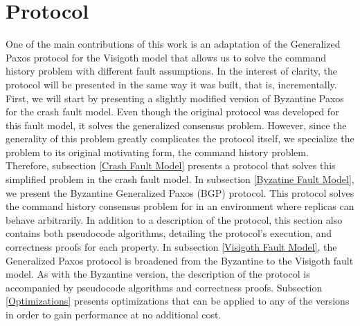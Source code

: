 \chapter{Protocol}

One of the  main contributions of this work is an adaptation of the Generalized Paxos protocol for the Visigoth model that allows us to solve the command history problem with different fault assumptions. In the interest of clarity, the protocol will be presented in the same way it was built, that is, incrementally. First, we will start by presenting a slightly modified version of Byzantine Paxos for the crash fault model. Even though the original protocol was developed for this fault model, it solves the generalized consensus problem. However, since the generality of this problem greatly complicates the protocol itself, we specialize the problem to its original motivating form, the command history problem. Therefore, subsection \ref{Crash Fault Model} presents a protocol that solves this simplified problem in the crash fault model. In subsection \ref{Byzatine Fault Model}, we present the Byzantine Generalized Paxos (BGP) protocol. This protocol solves the command history consensus problem for in an environment where replicas can behave arbitrarily. In addition to a description of the protocol, this section also contains both pseudocode algorithms, detailing the protocol's execution, and correctness proofs for each property. In subsection \ref{Visigoth Fault Model}, the Generalized Paxos protocol is broadened from the Byzantine to the Visigoth fault model. As with the Byzantine version, the description of the protocol is accompanied by pseudocode algorithms and correctness proofs. Subsection \ref{Optimizations} presents optimizations that can be applied to any of the versions in order to gain performance at no additional cost.



\clearpage


\clearpage

\clearpage



%
